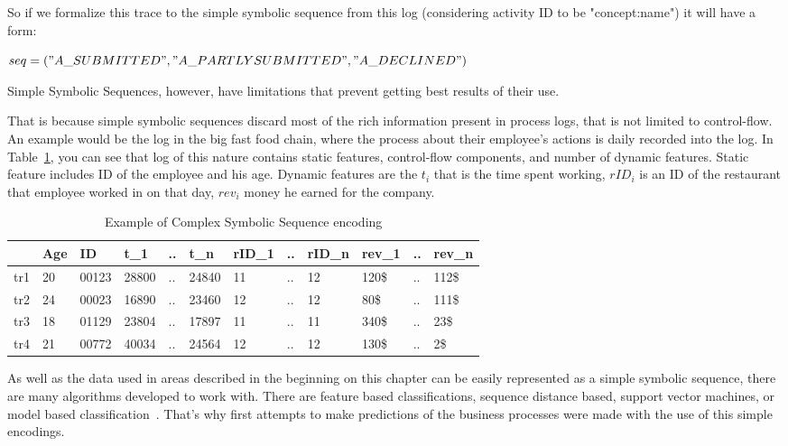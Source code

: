 So if we formalize this trace to the simple symbolic sequence from this log (considering activity ID to be "concept:name") it will have a form:

$seq = ("A\_SUBMITTED","A\_PARTLYSUBMITTED","A\_DECLINED")$

Simple Symbolic Sequences, however, have limitations that prevent getting best results of their use.

That is because simple symbolic sequences discard most of the rich information present in process logs, that is not limited to control-flow. An example would be the log in the big fast food chain, where the process about their employee's actions is daily recorded into the log. In Table~\ref{tab:statements}, you can see that log of this nature contains static features, control-flow components, and number of dynamic features. Static feature includes ID of the employee and his age. Dynamic features are the $t_i$ that is the time spent working, $rID_i$ is an ID of the restaurant that employee worked in on that day, $rev_i$ money he earned for the company. 

\begin{table}[h]
	\centering
	\begin{tabular}{| l | l | l | l | l | l | l | l | l | l | l | l |}
		\hline
		& Age & ID & t\_1 & .. & t\_n & rID\_1 & .. & rID\_n & rev\_1 & .. & rev\_n \\	
		\hline
		tr1 & 20 & 00123 & 28800 & .. & 24840 & 11 & .. & 12 & 120\$ & .. & 112\$ \\
		tr2 & 24 & 00023 & 16890 & .. & 23460 & 12 & .. & 12 & 80\$ & .. & 111\$ \\
		tr3 & 18 & 01129 & 23804 & .. & 17897 & 11 & .. & 11 & 340\$ & .. & 23\$ \\
		tr4 & 21 & 00772 & 40034 & .. & 24564 & 12 & .. & 12 & 130\$ & .. & 2\$ \\
		\hline
	\end{tabular}
	\caption{Example of Complex Symbolic Sequence encoding}
	\label{tab:statements}
\end{table}


As well as the data used in areas described in the beginning on this chapter can be easily represented as a simple symbolic sequence, there are many algorithms developed to work with. There are feature based classifications, sequence distance based, support vector machines, or model based classification~\cite{Xing:2010:BSS:1882471.1882478}. That's why first attempts to make predictions of the business processes were made with the use of this simple encodings.


